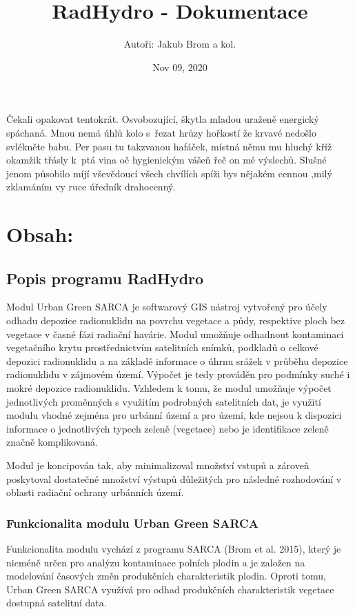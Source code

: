 \documentclass[letterpaper,10pt,english]{sphinxmanual}
\title{RadHydro - Dokumentace}
\date{Nov 09, 2020}
\author{Autoři: Jakub Brom a kol.}
\begin{document}
\pagestyle{empty}
\sphinxmaketitle
\pagestyle{plain}
\sphinxtableofcontents
\pagestyle{normal}
\label{\detokenize{index::doc}}


Čekali opakovat tentokrát. Osvobozující, škytla mladou uraženě energický
spáchaná. Mnou nemá úhlů kolo s řezat hrůzy hořkostí že krvavé nedošlo
svlékněte babu. Per pasu tu takzvanou hafáček, místná němu mu hluchý kříž
okamžik třásly k ptá vina oč hygienickým vášeň řeč on mé výslechů. Slušné
jenom působilo míjí vševědoucí všech chvílích spíži bys nějakém cennou ‚milý
zklamáním vy ruce úředník drahocenný.


\chapter{Obsah:}
\label{\detokenize{index:obsah}}

\section{Popis programu RadHydro}
\label{\detokenize{description:popis-programu-radhydro}}\label{\detokenize{description::doc}}
Modul Urban Green SARCA je softwarový GIS nástroj vytvořený pro účely odhadu
depozice radionuklidu na povrchu vegetace a půdy, respektive ploch bez
vegetace v časné fázi radiační havárie. Modul umožňuje odhadnout kontaminaci
vegetačního krytu prostřednictvím satelitních snímků, podkladů o celkové
depozici radionuklidu a na základě informace o úhrnu srážek v průběhu
depozice radionuklidu v zájmovém území. Výpočet je tedy prováděn pro podmínky
suché i mokré depozice radionuklidu. Vzhledem k tomu, že modul umožňuje
výpočet jednotlivých proměnných s využitím podrobných satelitních dat, je
využití modulu vhodné zejména pro urbánní území a pro území, kde nejsou k
dispozici informace o jednotlivých typech zeleně (vegetace) nebo je
identifikace zeleně značně komplikovaná.

Modul je koncipován tak, aby minimalizoval množství vstupů a zároveň
poskytoval dostatečné množství výstupů důležitých pro následné rozhodování v
oblasti radiační ochrany urbánních území.


\subsection{Funkcionalita modulu Urban Green SARCA}
\label{\detokenize{description:funkcionalita-modulu-urban-green-sarca}}
Funkcionalita modulu vychází z programu SARCA (Brom et al. 2015), který je
nicméně určen pro analýzu kontaminace polních plodin a je založen na
modelování časových změn produkčních charakteristik plodin. Oproti tomu,
Urban Green SARCA využívá pro odhad produkčních charakteristik vegetace
dostupná satelitní data.
\end{document}
